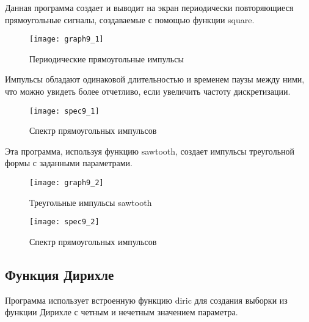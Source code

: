 
\parindent=1cm
Данная программа создает и выводит на экран периодически повторяющиеся прямоугольные сигналы, создаваемые с помощью функции square.

\begin{figure}[H]
	\begin{center}
		\texttt{[image: graph9\_1]}
		\caption{Периодические прямоугольные импульсы} 
		\label{pic:graph9_1} %
	\end{center}
\end{figure}
Импульсы обладают одинаковой длительностью и временем паузы между ними, что можно увидеть более отчетливо, если увеличить частоту дискретизации.
\begin{figure}[H]
	\begin{center}
		\texttt{[image: spec9\_1]}
		\caption{Спектр прямоугольных импульсов} 
		\label{pic:spec9_1} %
	\end{center}
\end{figure}


\parindent=1cm
Эта программа, используя функцию sawtooth, создает импульсы треугольной формы с заданными параметрами.

\begin{figure}[H]
	\begin{center}
		\texttt{[image: graph9\_2]}
		\caption{Треугольные импульсы sawtooth} 
		\label{pic:graph9_2} %
	\end{center}
\end{figure}
\begin{figure}[H]
	\begin{center}
		\texttt{[image: spec9\_2]}
		\caption{Спектр прямоугольных импульсов} 
		\label{pic:spec9_2} %
	\end{center}
\end{figure}

\subsection{Функция Дирихле}


\parindent=1cm
Программа использует встроенную функцию diric для создания выборки из функции Дирихле с четным и нечетным значением параметра.

